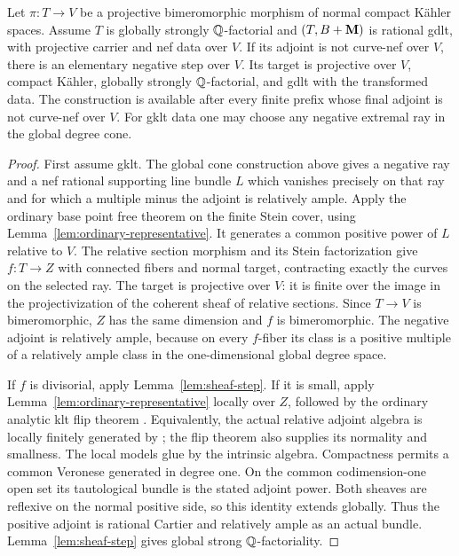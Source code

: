 \begin{proposition}\label{prop:relative-steps}
Let $\pi\colon T\to V$ be a projective bimeromorphic morphism of
normal compact K\"ahler spaces.  Assume $T$ is globally strongly
$\mathbb Q$-factorial and $(T,B+\mathbf M)$ is rational gdlt, with projective
carrier and nef data over $V$.  If its adjoint is not curve-nef over
$V$, there is an elementary negative step over $V$.  Its target is
projective over $V$, compact K\"ahler, globally strongly
$\mathbb Q$-factorial, and gdlt with the transformed data.  The construction
is available after every finite prefix whose final adjoint is not
curve-nef over $V$.  For gklt data one may choose
any negative extremal ray in the global degree cone.
\end{proposition}

\begin{proof}
First assume gklt.  The global cone construction above gives a negative
ray and a nef rational supporting line bundle $L$ which vanishes
precisely on that ray and for which a multiple minus the adjoint is
relatively ample.  Apply the ordinary base point free theorem on the
finite Stein cover, using Lemma~\ref{lem:ordinary-representative}.
It generates a common positive power of $L$ relative to $V$.
The relative section morphism and its Stein factorization give
$f\colon T\to Z$ with connected fibers and normal target, contracting
exactly the curves on the selected ray.  The target is projective over
$V$: it is finite over the image in the projectivization of the
coherent sheaf of relative sections.  Since $T\to V$ is bimeromorphic,
$Z$ has the same dimension and $f$ is bimeromorphic.  The negative
adjoint is relatively ample, because on every $f$-fiber its class is
a positive multiple of a relatively ample class in the one-dimensional
global degree space.

If $f$ is divisorial, apply Lemma~\ref{lem:sheaf-step}.  If it is
small, apply Lemma~\ref{lem:ordinary-representative} locally over
$Z$, followed by the ordinary analytic klt flip theorem
\cite[Theorem~1.14]{Fujino2022}.  Equivalently, the actual relative
adjoint algebra is locally finitely generated by
\cite[Corollary~3.7]{DHP2024}; the flip theorem also supplies its
normality and smallness.  The local models glue by the intrinsic
algebra.  Compactness permits a common Veronese generated in degree
one.  On the common codimension-one open set its tautological bundle
is the stated adjoint power.  Both sheaves are reflexive on the normal
positive side, so this identity extends globally.  Thus the positive
adjoint is rational Cartier and relatively ample as an actual bundle.
Lemma~\ref{lem:sheaf-step} gives global strong $\mathbb Q$-factoriality.


\end{proof}
